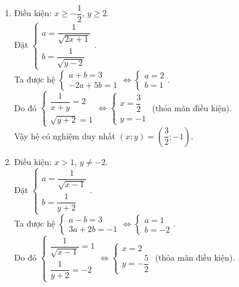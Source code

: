 \begin{bt}
{\begin{enumerate}
			Vậy hệ có nghiệm duy nhất $\left(x;y\right) = \left(\dfrac{3}{2};-1\right)$.
			\item 
			Điều kiện: $x \ge -\dfrac{1}{2}$, $y \ge 2$.\\
			Đặt $\begin{cases} a = \dfrac{1}{\sqrt{2x+1}}\\ b = \dfrac{1}{\sqrt{y-2}}\end{cases}$.\\ 
			Ta được hệ $\begin{cases} a + b = 3\\ -2a  + 5b = 1\end{cases} \Leftrightarrow \begin{cases} a = 2\\ b = 1 \end{cases}$. \\
			Do đó $\begin{cases} \dfrac{1}{x+y} =2\\ \sqrt{y+2} = 1 \end{cases} \Leftrightarrow \begin{cases} x=\dfrac{3}{2}\\ y = -1 \end{cases}$ (thỏa mãn điều kiện).\\
			Vậy hệ có nghiệm duy nhất $\left(x;y\right) = \left(\dfrac{3}{2};-1\right)$.
			\item Điều kiện: $x > 1$, $y \ne -2$.\\
			Đặt $\begin{cases} a = \dfrac{1}{\sqrt{x-1}}\\ b = \dfrac{1}{y+2}\end{cases}$.\\ 
			Ta được hệ $\begin{cases} a - b = 3\\ 3a  + 2b = -1\end{cases} \Leftrightarrow \begin{cases} a = 1\\ b = -2 \end{cases}$. \\
			Do đó $\begin{cases} \dfrac{1}{\sqrt{x-1}} =1\\ \dfrac{1}{y+2} = -2 \end{cases} \Leftrightarrow \begin{cases} x=2\\ y = -\dfrac{5}{2} \end{cases}$ (thỏa mãn điều kiện).\\

\end{enumerate}}
\end{bt}
